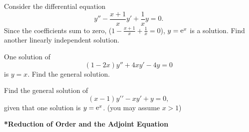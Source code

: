 {\begin{Exercise}
\end{Exercise}





\begin{Exercise}
  \label{exercise y-x+1xy+1xy}
  Consider the differential equation
  \[ 
  y'' - \frac{x+1}{x} y' + \frac{1}{x} y = 0. 
  \]
  Since the coefficients sum to zero, ($1 - \frac{x+1}{x} + \frac{1}{x} = 0$),
  $y = \mathop{\mathrm{e}}\nolimits^x$ is a solution.  Find another linearly independent solution.

\end{Exercise}






\begin{Exercise}
  \label{exercise 1-2xy+4xy-4y}
  One solution of 
  \[
  (1 - 2 x) y'' + 4 x y' - 4 y = 0
  \]
  is $y = x$.  Find the general solution.

\end{Exercise}





\begin{Exercise}
  \label{exercise (x-1)y-xy+y=0}
  Find the general solution of
  \[ 
  (x-1) y\prime\prime - x y\prime + y = 0, 
  \]
  given that one solution is $y = \mathop{\mathrm{e}}\nolimits^x$. (you may assume $x > 1$)

\end{Exercise}









\begin{large}
  \noindent
  \textbf{*Reduction of Order and the Adjoint Equation}
\end{large}





























\raggedbottom
}
{
}
\pagebreak
\flushbottom
